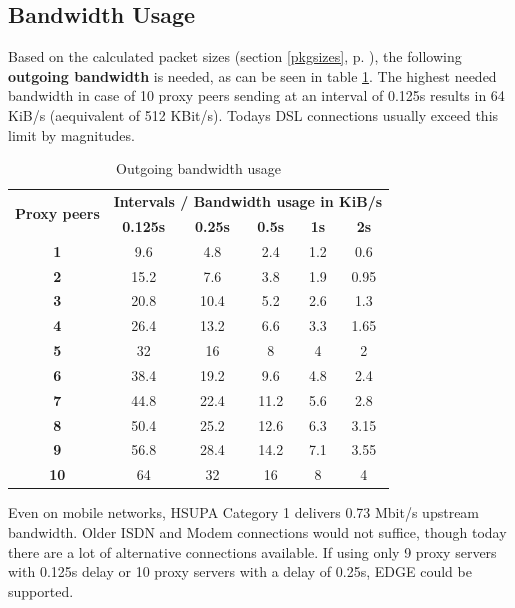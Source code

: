 \subsection{Bandwidth Usage}
Based on the calculated packet sizes (section \ref{pkgsizes}, p. \pageref{pkgsizes}), 
the following \textbf{outgoing bandwidth}
is needed, as can be seen in table \ref{bandwidth}.
The highest needed bandwidth
in case of 10 proxy peers sending at an interval of 0.125s results in 64 KiB/s
(aequivalent of 512 KBit/s).
 Todays DSL connections usually exceed this limit by magnitudes.
\begin{longtable}{|c|c|c|c|c|c|}
\caption{Outgoing bandwidth usage}
\label{bandwidth}\\
\hline
\multirow{2}{*}{\textbf{Proxy peers}} & \multicolumn{5}{|l|}{\textbf{Intervals / Bandwidth usage in KiB/s}} \\
& \textbf{0.125s} & \textbf{0.25s} & \textbf{0.5s} & \textbf{1s} & \textbf{2s}\\
\hline
\textbf{1} & 9.6 & 4.8 & 2.4 & 1.2 & 0.6\\
\hline
\textbf{2} & 15.2 & 7.6 & 3.8 & 1.9 & 0.95\\
\hline
\textbf{3} & 20.8 & 10.4 & 5.2 & 2.6 & 1.3\\
\hline
\textbf{4} & 26.4 & 13.2 & 6.6 & 3.3 & 1.65\\
\hline
\textbf{5} & 32 & 16 & 8 & 4 & 2\\
\hline
\textbf{6} & 38.4 & 19.2 & 9.6 & 4.8 & 2.4\\
\hline
\textbf{7} & 44.8 & 22.4 & 11.2 & 5.6 & 2.8\\
\hline
\textbf{8} & 50.4 & 25.2 & 12.6 & 6.3 & 3.15\\
\hline
\textbf{9} & 56.8 & 28.4 & 14.2 & 7.1 & 3.55\\
\hline
\textbf{10} & 64 & 32 & 16 & 8 & 4\\
\hline
\end{longtable}
Even on mobile networks, HSUPA Category 1 delivers 0.73 Mbit/s upstream bandwidth.
Older ISDN and Modem connections would not suffice, though
today there are a lot of alternative connections
 available.\cite{wiki:bitrates}
If using only 9 proxy servers with 0.125s delay or
10 proxy servers with a delay of 0.25s, EDGE could be supported.


